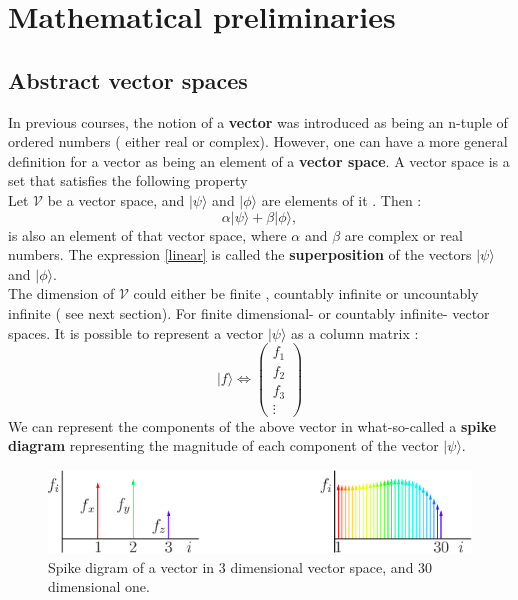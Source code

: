 \chapter{Mathematical preliminaries}
    
   \section{Abstract vector spaces}
   In previous courses, the notion of a \textbf{vector} was introduced as being an n-tuple of ordered numbers ( either real or complex). However, one can have a more general definition for a vector as being an element of a \textbf{vector space}. A vector space is a set that  satisfies the following property\\
   Let $ \mathcal{V}$ be a vector space, and $\lvert \psi \rangle$ and $\lvert \phi \rangle$ are elements of it . Then :
   \begin{equation}
   	 \alpha  \lvert \psi \rangle +  \beta \lvert \phi \rangle, 
   	 \label{linear}
   \end{equation}
   is also an element of that vector space, where $ \alpha$ and $ \beta$ are complex or real numbers. 
   The expression \eqref{linear} is called the \textbf{superposition} of the vectors $\lvert \psi \rangle$ and $\lvert \phi \rangle$. \\ The dimension of $ \mathcal{V}$ could either be finite , countably infinite or uncountably infinite ( see next section). For  finite dimensional- or countably infinite- vector spaces. It is possible to represent a vector $\lvert \psi \rangle$ as a column matrix :
   \begin{equation}
   \lvert f \rangle \Leftrightarrow \left( \begin{array}{c}
f_1\\ f_2\\ f_3\\\vdots
   \end{array}\right) 
   \end{equation}
   We can represent the components of the above vector in what-so-called a \textbf{spike diagram } representing the magnitude of each component of the vector $ \lvert \psi \rangle $. 
   \begin{figure}[h!]
   	\centering
   	\includegraphics[width=0.9 \textwidth]{./figures/spike}
   	\caption{ Spike digram of a vector in 3 dimensional vector space, and 30 dimensional one. }
   \end{figure}
